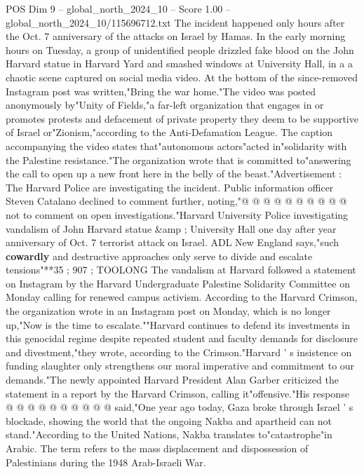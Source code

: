 \begin{textsample}{POS Dim 9 – global\_north\_2024\_10 – Score 1.00 – global\_north\_2024\_10/115696712.txt}  \label{ex:f9_pos_228}
The incident happened only hours after the Oct. 7 anniversary of the attacks on Israel by Hamas.
In the early morning hours on Tuesday, a group of unidentified people drizzled fake blood on the John Harvard statue in Harvard Yard and smashed windows at University Hall, in a a chaotic scene captured on social media video.
At the bottom of the since-removed Instagram post was written,"Bring the war home."The video was posted anonymously by"Unity of Fields,"a far-left organization that engages in or promotes protests and defacement of private property they deem to be supportive of Israel or"Zionism,"according to the Anti-Defamation League.
The caption accompanying the video states that"autonomous actors"acted in"solidarity with the Palestine resistance."The organization wrote that is committed to"answering the call to open up a new front here in the belly of the beast."Advertisement : The Harvard Police are investigating the incident.
Public information officer Steven Catalano declined to comment further, noting,"@ @ @ @ @ @ @ @ @ @ not to comment on open investigations."Harvard University Police investigating vandalism of John Harvard statue \&amp ; University Hall one day after year anniversary of Oct. 7 terrorist attack on Israel.
ADL New England says,"such \textbf{cowardly} and destructive approaches only serve to divide and escalate tensions"**35 ; 907 ; TOOLONG The vandalism at Harvard followed a statement on Instagram by the Harvard Undergraduate Palestine Solidarity Committee on Monday calling for renewed campus activism.
According to the Harvard Crimson, the organization wrote in an Instagram post on Monday, which is no longer up,"Now is the time to escalate.""Harvard continues to defend its investments in this genocidal regime despite repeated student and faculty demands for disclosure and divestment,"they wrote, according to the Crimson."Harvard ' s insistence on funding slaughter only strengthens our moral imperative and commitment to our demands."The newly appointed Harvard President Alan Garber criticized the statement in a report by the Harvard Crimson, calling it"offensive."His response @ @ @ @ @ @ @ @ @ @ said,"One year ago today, Gaza broke through Israel ' s blockade, showing the world that the ongoing Nakba and apartheid can not stand."According to the United Nations, Nakba translates to"catastrophe"in Arabic.
The term refers to the mass displacement and dispossession of Palestinians during the 1948 Arab-Israeli War.

\end{textsample}
